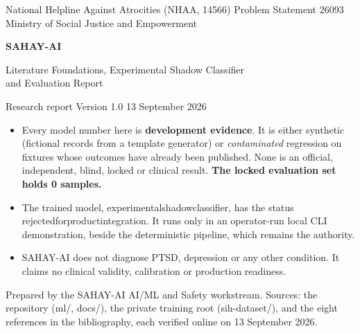 \documentclass[11pt,a4paper]{article}
\newcommand{\codeus}{\textunderscore\allowbreak}
\DeclareRobustCommand{\code}[1]{{\ttfamily\let\_\codeus #1}}
\begin{document}
\begin{titlepage}
\centering
{\small\color{sahaygray} National Helpline Against Atrocities (NHAA, 14566) \textbullet{} Problem Statement 26093 \textbullet{} Ministry of Social Justice and Empowerment\par}
\vspace{2.4cm}
{\fontsize{34}{40}\selectfont\bfseries\color{sahayblue} SAHAY-AI\par}
\vspace{0.5cm}
{\LARGE Literature Foundations, Experimental Shadow Classifier\\[2pt] and Evaluation Report\par}
\vspace{0.9cm}
{\large Research report \textbullet{} Version 1.0 \textbullet{} 13 September 2026\par}
\vspace{1.6cm}
\begin{warnbox}[title={What this report is, and what it is not}]
\small
\begin{itemize}
  \item Every model number here is \textbf{development evidence}. It is either synthetic
        (fictional records from a template generator) or \emph{contaminated} regression on
        fixtures whose outcomes have already been published. None is an official, independent,
        blind, locked or clinical result. \textbf{The locked evaluation set holds 0 samples.}
  \item The trained model, \code{experimental\_shadow\_classifier}, has the status
        \code{rejected\_for\_product\_integration}. It runs only in an operator-run local CLI
        demonstration, beside the deterministic pipeline, which remains the authority.
  \item SAHAY-AI does not diagnose PTSD, depression or any other condition. It claims no clinical
        validity, calibration or production readiness.
\end{itemize}
\end{warnbox}
\vfill
{\small\color{sahaygray} Prepared by the SAHAY-AI AI/ML and Safety workstream. Sources: the repository
(\code{ml/}, \code{docs/}), the private training root (\code{sih-dataset/}), and the eight references in the
bibliography, each verified online on 13 September 2026.\par}
\end{titlepage}
\end{document}
